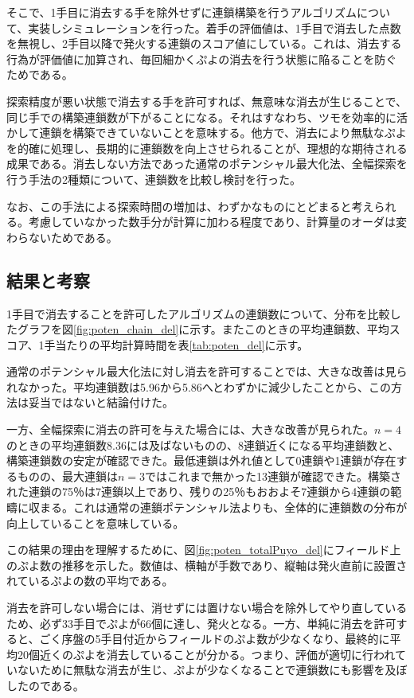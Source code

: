 \documentclass[12pt]{jarticle}
\begin{document}
そこで、1手目に消去する手を除外せずに連鎖構築を行うアルゴリズムについて、実装しシミュレーションを行った。着手の評価値は、1手目で消去した点数を無視し、2手目以降で発火する連鎖のスコア値にしている。これは、消去する行為が評価値に加算され、毎回細かくぷよの消去を行う状態に陥ることを防ぐためである。

探索精度が悪い状態で消去する手を許可すれば、無意味な消去が生じることで、同じ手での構築連鎖数が下がることになる。それはすなわち、ツモを効率的に活かして連鎖を構築できていないことを意味する。他方で、消去により無駄なぷよを的確に処理し、長期的に連鎖数を向上させられることが、理想的な期待される成果である。消去しない方法であった通常のポテンシャル最大化法、全幅探索を行う手法の2種類について、連鎖数を比較し検討を行った。

なお、この手法による探索時間の増加は、わずかなものにとどまると考えられる。考慮していなかった数手分が計算に加わる程度であり、計算量のオーダは変わらないためである。

\subsection{結果と考察}
1手目で消去することを許可したアルゴリズムの連鎖数について、分布を比較したグラフを図\ref{fig:poten_chain_del}に示す。またこのときの平均連鎖数、平均スコア、1手当たりの平均計算時間を表\ref{tab:poten_del}に示す。

通常のポテンシャル最大化法に対し消去を許可することでは、大きな改善は見られなかった。平均連鎖数は5.96から5.86へとわずかに減少したことから、この方法は妥当ではないと結論付けた。

一方、全幅探索に消去の許可を与えた場合には、大きな改善が見られた。$n=4$のときの平均連鎖数8.36には及ばないものの、8連鎖近くになる平均連鎖数と、構築連鎖数の安定が確認できた。最低連鎖は外れ値として0連鎖や1連鎖が存在するものの、最大連鎖は$n=3$ではこれまで無かった13連鎖が確認できた。構築された連鎖の75％は7連鎖以上であり、残りの25％もおおよそ7連鎖から4連鎖の範疇に収まる。これは通常の連鎖ポテンシャル法よりも、全体的に連鎖数の分布が向上していることを意味している。

この結果の理由を理解するために、図\ref{fig:poten_totalPuyo_del}にフィールド上のぷよ数の推移を示した。数値は、横軸が手数であり、縦軸は発火直前に設置されているぷよの数の平均である。

消去を許可しない場合には、消せずには置けない場合を除外してやり直しているため、必ず33手目でぷよが66個に達し、発火となる。一方、単純に消去を許可すると、ごく序盤の5手目付近からフィールドのぷよ数が少なくなり、最終的に平均20個近くのぷよを消去していることが分かる。つまり、評価が適切に行われていないために無駄な消去が生じ、ぷよが少なくなることで連鎖数にも影響を及ぼしたのである。
\end{document}

